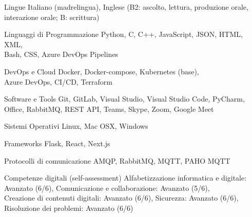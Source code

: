 
\cvskill
{Lingue} %
{Italiano (madrelingua), Inglese (B2: ascolto, lettura, produzione orale, interazione orale; B: scrittura)} %




\begin{cvskills}


\cvskill
{Linguaggi di Programmazione} %
{Python, C, C++, JavaScript, JSON, HTML, XML,\\
 Bash, CSS, Azure DevOps Pipelines} %


\cvskill
{DevOps e Cloud} %
{Docker, Docker-compose, Kubernetes (base),\\
 Azure DevOps, CI/CD, Terraform} %


\cvskill
{Software e Tools} %
{Git, GitLab, Visual Studio, Visual Studio Code, PyCharm,\\
 Office, RabbitMQ, REST API, Teams, Skype, Zoom, Google Meet} %


\cvskill
{Sistemi Operativi} %
{Linux, Mac OSX, Windows} %


\cvskill
{Frameworks} %
{Flask, React, Next.js} %


\cvskill
{Protocolli di comunicazione} %
{AMQP, RabbitMQ, MQTT, PAHO MQTT} %


\cvskill
{Competenze digitali (self-assessment)} %
{Alfabetizzazione informatica e digitale: Avanzato (6/6), Comunicazione e collaborazione: Avanzato (5/6),\\
 Creazione di contenuti digitali: Avanzato (6/6), Sicurezza: Avanzato (6/6), Risoluzione dei problemi: Avanzato (6/6)} %


\end{cvskills}